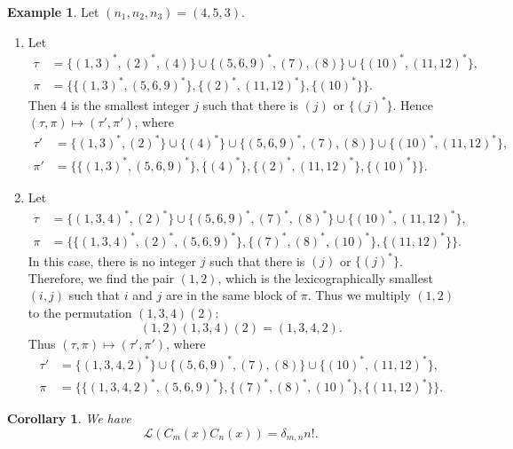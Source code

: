 \documentclass[oneside]{book}
\numberwithin{equation}{section}
\newtheorem{cor}[thm]{Corollary}
\theoremstyle{definition}
\newtheorem{exam}[thm]{Example}
\newcommand\LL{\mathcal{L}}
\begin{document}
\begin{exam}
  Let \( (n_1,n_2,n_3) = (4,5,3) \).
 \begin{enumerate}
 \item Let 
   \begin{align*}
     \tau &= \{ (1,3)^*, (2)^*, (4)\}\cup \{(5,6,9)^*, (7), (8)\}\cup \{ (10)^*, (11,12)^*\},\\
     \pi &= \bigg\{ \{ (1,3)^*, (5,6,9)^*\}, \{(2)^*,(11,12)^*\}, \{(10)^*\} \bigg\}.
   \end{align*}
   Then \( 4 \) is the smallest integer \( j \) such that there is
   \( (j) \) or \( \{(j)^*\} \). Hence
   \( (\tau,\pi) \mapsto (\tau',\pi') \), where
   \begin{align*}
     \tau' &= \{ (1,3)^*, (2)^*\}\cup \{(4)^*\}\cup \{(5,6,9)^*, (7), (8)\}\cup \{ (10)^*, (11,12)^*\},\\
     \pi' &= \bigg\{ \{ (1,3)^*, (5,6,9)^* \},\{(4)^*\}, \{(2)^*,(11,12)^*\}, \{(10)^*\} \bigg\}.
   \end{align*}

 \item Let 
   \begin{align*}
     \tau &= \{ (1,3,4)^*, (2)^* \}\cup \{(5,6,9)^*, (7)^*, (8)^*\}\cup \{ (10)^*, (11,12)^*\},\\
     \pi &= \bigg\{ \{ (1,3,4)^*,(2)^*, (5,6,9)^* \}, \{ (7)^*, (8)^*, (10)^*\},\{(11,12)^*\} \bigg\}.
   \end{align*}
   In this case, there is no integer \( j \) such that there is
   \( (j) \) or \( \{(j)^*\} \). Therefore, we find the pair
   \( (1,2) \), which is the lexicographically smallest \( (i,j) \)
   such that \( i \) and \( j \) are in the same block of \( \pi \).
   Thus we multiply \( (1,2) \) to the permutation \( (1,3,4)(2) \):
   \[
     (1,2)(1,3,4)(2) = (1,3,4,2).
   \]
   Thus \( (\tau,\pi) \mapsto (\tau',\pi') \), where
   \begin{align*}
     \tau' &= \{ (1,3,4,2)^* \}\cup \{(5,6,9)^*, (7), (8)\}\cup \{ (10)^*, (11,12)^*\},\\
     \pi &= \bigg\{ \{ (1,3,4,2)^*, (5,6,9)^* \}, \{ (7)^*, (8)^*, (10)^*\},\{(11,12)^*\} \bigg\}.
   \end{align*}
 \end{enumerate}
\end{exam}

\begin{cor}
  We have
\[
  \LL(C_{m}(x)C_{n}(x)) = \delta_{m,n} n!.
\]
\end{cor}
\end{document}
